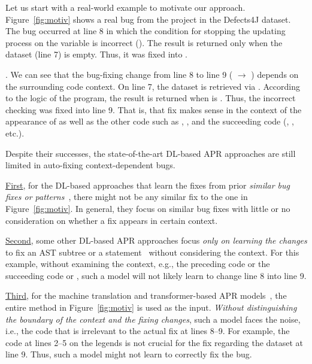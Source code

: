 Let us start with a real-world example to motivate our approach.
Figure~\ref{fig:motiv} shows a real bug from the project 
in the Defects4J dataset. The bug occurred at line 8 in which the
condition for stopping the updating process on the 
variable is incorrect (). The result is
returned only when the dataset (line 7) is empty. Thus, it was fixed
into .

. We
can see that the bug-fixing change from line 8 to line 9 ( $\rightarrow$ )
depends on the surrounding code context. On line 7, the dataset is
retrieved via . According to the logic of the
program, the result is returned when  is .
Thus, the incorrect checking was fixed into line 9. That is, that fix
makes sense in the context of the appearance of  as
well as the other code such as ,
, and the succeeding code
(, , etc.).

Despite their successes, the state-of-the-art DL-based APR approaches
are still limited in auto-fixing context-dependent
bugs.

\underline{First}, for the DL-based approaches that learn the
fixes from prior {\em similar bug fixes or
  patterns}~\cite{gupta2017deepfix,white2019sorting,white2016deep},
there might not be any similar fix to the one in
Figure~\ref{fig:motiv}. In general, they focus on similar bug fixes
with little or no consideration on whether a fix appears in certain
context.

\underline{Second}, some other DL-based APR approaches focus {\em only on
learning the changes} to fix an AST subtree or a
statement~\cite{chakrabortycodit,see2017get} without considering the
context. For this example, without examining the context, e.g., the
preceding code  or the succeeding code
 or , such a model will not
likely learn to change line 8 into line 9.

\underline{Third}, for the machine translation and transformer-based
APR models~\cite{chen2018sequencer,hata2018learning}, the entire
method in Figure~\ref{fig:motiv} is used as the input. {\em Without
distinguishing the boundary of the context and the fixing changes},
such a model faces the noise, i.e., the code that is irrelevant to the
actual fix at lines 8--9. For example, the code at lines 2--5 on the
legends is not crucial for the fix regarding the dataset at line
9. Thus, such a model might not learn to correctly fix the bug.

